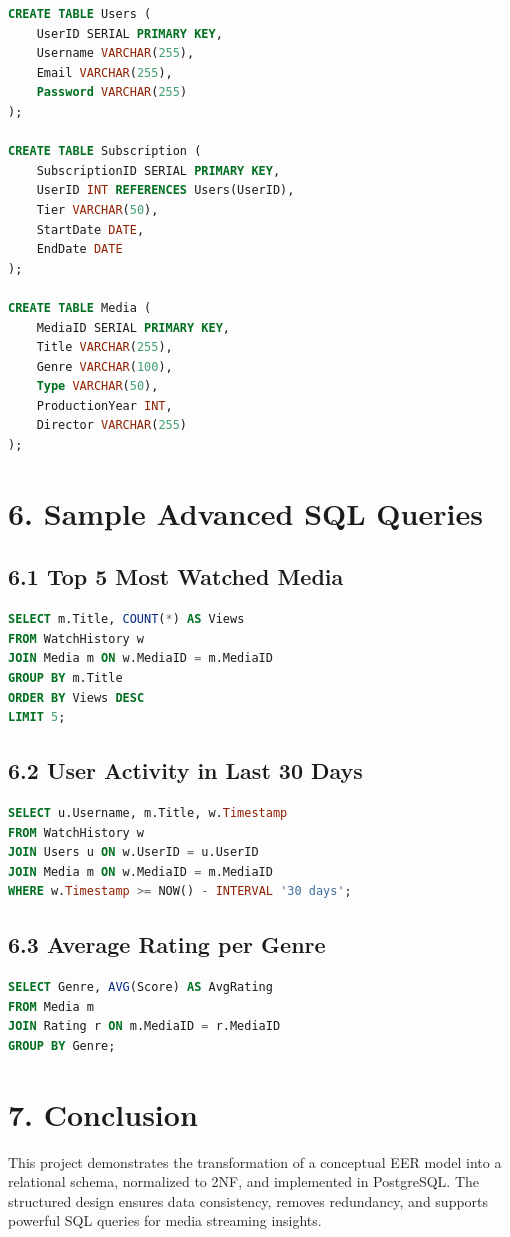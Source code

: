 \documentclass[12pt]{article}
\begin{document}
\begin{lstlisting}[language=SQL]
CREATE TABLE Users (
    UserID SERIAL PRIMARY KEY,
    Username VARCHAR(255),
    Email VARCHAR(255),
    Password VARCHAR(255)
);

CREATE TABLE Subscription (
    SubscriptionID SERIAL PRIMARY KEY,
    UserID INT REFERENCES Users(UserID),
    Tier VARCHAR(50),
    StartDate DATE,
    EndDate DATE
);

CREATE TABLE Media (
    MediaID SERIAL PRIMARY KEY,
    Title VARCHAR(255),
    Genre VARCHAR(100),
    Type VARCHAR(50),
    ProductionYear INT,
    Director VARCHAR(255)
);
\end{lstlisting}

\section*{6. Sample Advanced SQL Queries}

\subsection*{6.1 Top 5 Most Watched Media}
\begin{lstlisting}[language=SQL]
SELECT m.Title, COUNT(*) AS Views
FROM WatchHistory w
JOIN Media m ON w.MediaID = m.MediaID
GROUP BY m.Title
ORDER BY Views DESC
LIMIT 5;
\end{lstlisting}

\subsection*{6.2 User Activity in Last 30 Days}
\begin{lstlisting}[language=SQL]
SELECT u.Username, m.Title, w.Timestamp
FROM WatchHistory w
JOIN Users u ON w.UserID = u.UserID
JOIN Media m ON w.MediaID = m.MediaID
WHERE w.Timestamp >= NOW() - INTERVAL '30 days';
\end{lstlisting}

\subsection*{6.3 Average Rating per Genre}
\begin{lstlisting}[language=SQL]
SELECT Genre, AVG(Score) AS AvgRating
FROM Media m
JOIN Rating r ON m.MediaID = r.MediaID
GROUP BY Genre;
\end{lstlisting}

\section*{7. Conclusion}
This project demonstrates the transformation of a conceptual EER model into a relational schema, normalized to 2NF, and implemented in PostgreSQL. The structured design ensures data consistency, removes redundancy, and supports powerful SQL queries for media streaming insights.
\end{document}
